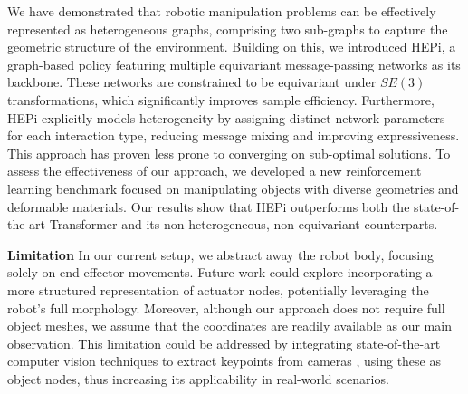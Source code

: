 We have demonstrated that robotic manipulation problems can be effectively represented as heterogeneous graphs, comprising two sub-graphs to capture the geometric structure of the environment. Building on this, we introduced HEPi, a graph-based policy featuring multiple equivariant message-passing networks as its backbone. These networks are constrained to be equivariant under $SE(3)$ transformations, which significantly improves sample efficiency. Furthermore, HEPi explicitly models heterogeneity by assigning distinct network parameters for each interaction type, reducing message mixing and improving expressiveness. This approach has proven less prone to converging on sub-optimal solutions. To assess the effectiveness of our approach, we developed a new reinforcement learning benchmark focused on manipulating objects with diverse geometries and deformable materials. Our results show that HEPi outperforms both the state-of-the-art Transformer and its non-heterogeneous, non-equivariant counterparts.

\textbf{Limitation} In our current setup, we abstract away the robot body, focusing solely on end-effector movements. Future work could explore incorporating a more structured representation of actuator nodes, potentially leveraging the robot's full morphology. Moreover, although our approach does not require full object meshes, we assume that the  coordinates are readily available as our main observation. This limitation could be addressed by integrating state-of-the-art computer vision techniques to extract keypoints from cameras \citep{dino_tracker_2024, hou2024keygrid}, using these as object nodes, thus increasing its applicability in real-world scenarios.
